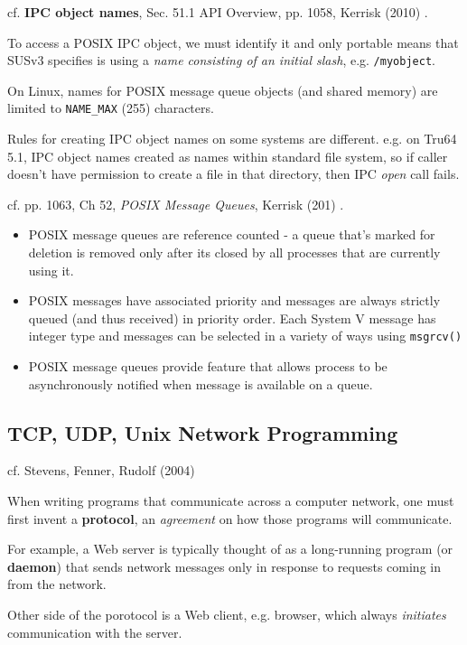 \documentclass[10pt]{amsart}
\begin{document}
cf. \textbf{IPC object names}, Sec. 51.1 API Overview, pp. 1058, Kerrisk (2010) \cite{Kerr2010}.

To access a POSIX IPC object, we must identify it and only portable means that SUSv3 specifies is using a \emph{name consisting of an initial slash}, e.g. \verb|/myobject|.

On Linux, names for POSIX message queue objects (and shared memory) are limited to \verb|NAME_MAX| (255) characters.

Rules for creating IPC object names on some systems are different. e.g. on Tru64 5.1, IPC object names created as names within standard file system, so if caller doesn't have permission to create a file in that directory, then IPC \emph{open} call fails.

cf. pp. 1063, Ch 52, \emph{POSIX Message Queues}, Kerrisk (201) \cite{Kerr2010}.

\begin{itemize}
	\item POSIX message queues are reference counted - a queue that's marked for deletion is removed only after its closed by all processes that are currently using it.
	\item POSIX messages have associated priority and messages are always strictly queued (and thus received) in priority order. Each System V message has integer type and messages can be selected in a variety of ways using \verb|msgrcv()|
	\item POSIX message queues provide feature that allows process to be asynchronously notified when message is available on a queue.
\end{itemize}

\subsection{TCP, UDP, Unix Network Programming}

cf. Stevens, Fenner, Rudolf (2004) \cite{SFR2004}

When writing programs that communicate across a computer network, one must first invent a \textbf{protocol}, an \emph{agreement} on how those programs will communicate.

For example, a Web server is typically thought of as a long-running program (or \textbf{daemon}) that sends network messages only in response to requests coming in from the network.

Other side of the porotocol is a Web client, e.g. browser, which always \emph{initiates} communication with the server.
\end{document}
